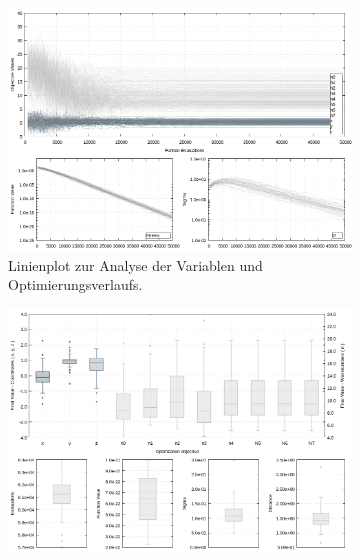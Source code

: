 \begin{landscape}
\begin{figure}[!ht]
	\caption[Evolutionsverlauf der Ergebnisse]{ Diese Grafik zeigt den Verlauf der Evolution. Es werden die Beiden letzten Experimente $2099$ (opben, ideale Messdaten) und $3099$ (unten, reale Messdaten) gezeigt. Diese Plots dienen nur der Einschätzung über den generellen Verlauf der Evolution. Es ist nicht sinnvoll sie für alle Experimente hier darzustellen. Anhand des Boxplots (Mitte) erkennend man, dass die Resultate für ideale Messwerte nicht so stark streuen, die Lösung der realen Messdaten ist den der idealen mind. Ebenbürtig. Es zeigt sich sogar, dass weniger Evaluationen der Zielfunktion bei den realen Werten nötig waren.}
	\label{fig:results3}
	\vspace{3mm}
	\centering
	\begin{subfigure}[t]{0.45\textheight}
	     \centering
	     \includegraphics[width=\textwidth]{img/evo/lines2089.png}
	             \caption{Linienplot zur Analyse der Variablen und Optimierungsverlaufs.}
	\end{subfigure}
	\qquad
	\begin{subfigure}[t]{0.45\textheight}
		\centering
	     \includegraphics[width=\textwidth]{img/evo/boxes2089.png}

\end{subfigure}
\end{figure}
\end{landscape}
